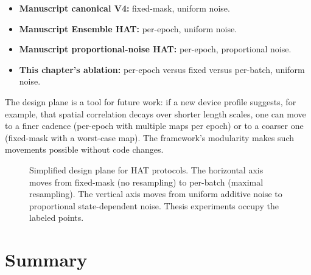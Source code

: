 \begin{itemize}[leftmargin=1.4em]
    \item \textbf{Manuscript canonical V4:} fixed-mask, uniform noise.
    \item \textbf{Manuscript Ensemble HAT:} per-epoch, uniform noise.
    \item \textbf{Manuscript proportional-noise HAT:} per-epoch, proportional noise.
    \item \textbf{This chapter's ablation:} per-epoch versus fixed versus per-batch, uniform noise.
\end{itemize}

The design plane is a tool for future work: if a new device profile suggests, for example, that spatial correlation decays over shorter length scales, one can move to a finer cadence (per-epoch with multiple maps per epoch) or to a coarser one (fixed-mask with a worst-case map). The framework's modularity makes such movements possible without code changes.

\begin{figure}[t]
    \centering
    \caption{Simplified design plane for HAT protocols. The horizontal axis moves from fixed-mask (no resampling) to per-batch (maximal resampling). The vertical axis moves from uniform additive noise to proportional state-dependent noise. Thesis experiments occupy the labeled points.}
    \label{fig:design-plane}
\end{figure}

\section{Summary}
\label{sec:summary}

